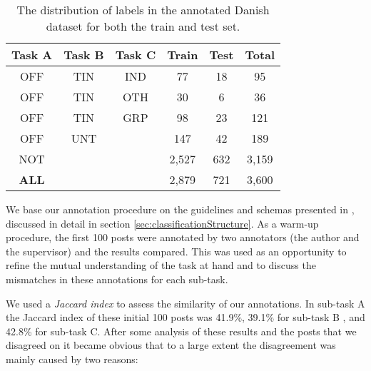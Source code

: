 \documentclass{article}
\begin{document}
\begin{table}
\centering
\footnotesize
\caption{The distribution of labels in the annotated Danish dataset for both the train and test set.}
\begin{tabular}{ccccc|c}
\textbf{Task A} & \textbf{Task B} & \textbf{Task C} & \textbf{Train} & \textbf{Test} & \textbf{Total} \\\hline
OFF                 & TIN                 & IND                 & 77             & 18            & 95             \\
OFF                 & TIN                 & OTH                 & 30             & 6             & 36             \\
OFF                 & TIN                 & GRP                 & 98             & 23            & 121            \\
OFF                 & UNT                 &                     & 147            & 42            & 189            \\
NOT                 &                     &                     & 2,527           & 632           & 3,159           \\\hline
\textbf{ALL}        &                     &                     & 2,879           & 721           & 3,600           \\
\end{tabular}
\label{table:daDatasetLabelDistribution}
\end{table}

We base our annotation procedure on the guidelines and schemas presented in \cite{zampieri2019predicting}, discussed in detail in section \ref{sec:classificationStructure}. As a warm-up procedure, the first 100 posts were annotated by two annotators (the author and the supervisor) and the results compared. This was used as an opportunity to refine the mutual understanding of the task at hand and to discuss the mismatches in these annotations for each sub-task.

We used a \textit{Jaccard index} \cite{jaccard} to assess the similarity of our annotations. In sub-task A the Jaccard index of these initial 100 posts was 41.9\%, 39.1\% for sub-task B , and 42.8\% for sub-task C. After some analysis of these results and the posts that we disagreed on it became obvious that to a large extent the disagreement was mainly caused by two reasons:
\end{document}
